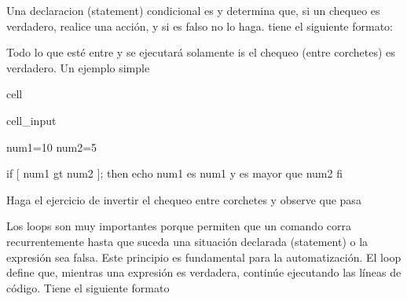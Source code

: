 \documentclass[letterpaper,10pt,english]{jupyterBook}
\begin{document}
\sphinxAtStartPar
Una declaracion (statement) condicional es  y determina que, si un chequeo es verdadero, realice una acción, y si es falso no lo haga.  tiene el siguiente formato:

\sphinxAtStartPar
{}

\sphinxAtStartPar
{}

\sphinxAtStartPar
{}

\sphinxAtStartPar
{}

\sphinxAtStartPar
Todo lo que esté entre  y  se ejecutará solamente is el chequeo (entre corchetes) es verdadero.
Un ejemplo simple

\begin{sphinxuseclass}{cell}\begin{sphinxVerbatimInput}

\begin{sphinxuseclass}{cell_input}
\begin{sphinxVerbatim}[commandchars=\\\{\}]
\PYGZdl{} num1=10
\PYGZdl{} num2=5

if [ \PYGZdl{}num1 \PYGZhy{}gt \PYGZdl{}num2 ]; then  
echo \PYGZdq{}num1 es \PYGZdl{}num1 y es mayor que \PYGZdl{}num2\PYGZdq{}
fi
\end{sphinxVerbatim}

\end{sphinxuseclass}\end{sphinxVerbatimInput}

\end{sphinxuseclass}
\sphinxAtStartPar
Haga el ejercicio de invertir el chequeo entre corchetes y observe que pasa

\begin{DUlineblock}{0em}
\item[] 
\end{DUlineblock}

\sphinxAtStartPar
Los loops son muy importantes porque permiten que un comando corra recurrentemente hasta que suceda una situación declarada (statement) o la expresión sea falsa. Este principio es fundamental para la automatización.
El loop  define que, mientras una expresión es verdadera, continúe ejecutando las líneas de código. Tiene el siguiente formato
\end{document}
